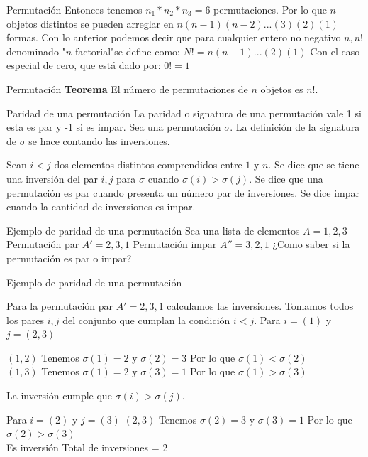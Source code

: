 \documentclass{beamer}
\begin{document}
\begin{frame}{Permutación}
  Entonces tenemos $n_1 * n_2 * n_3 = 6$ permutaciones.
  \vfill
  Por lo que $n$ objetos distintos se pueden arreglar en
  $n(n-1)(n-2)...(3)(2)(1)$ formas.
  \vfill
  Con lo anterior podemos decir que para cualquier entero no negativo $n,n!$
  denominado "$n$ factorial"se define como:
  \vfill
  $N! = n(n-1)...(2)(1)$
  \vfill
  Con el caso especial de cero, que está dado por:
  $0!=1$
\end{frame}


\begin{frame}{Permutación}
\textbf{Teorema}
\vfill
El número de permutaciones de $n$ objetos es $n!$.

\end{frame}


\begin{frame}{Paridad de una permutación}
La paridad o signatura de una permutación vale 1 si esta es par y -1 si es
impar.
\vfill
Sea una permutación $\sigma$. La definición de la signatura de $\sigma$ se hace contando las inversiones.

\vfill

Sean $i < j$ dos elementos distintos comprendidos entre $1$ y $n$. Se dice que
se tiene una inversión del par ${i, j}$ para $\sigma$ cuando $\sigma(i) > \sigma(j)$. 
\vfill
Se dice que una permutación es par cuando presenta un número par de inversiones.
\vfill
Se dice impar cuando la cantidad de inversiones es impar.

\end{frame}


\begin{frame}{Ejemplo de paridad de una permutación}
  Sea una lista de elementos $A={1,2,3}$
  \vfill
  Permutación par $A'={2,3,1}$
  \vfill
  Permutación impar $A''={3,2,1}$
  \vfill
  ¿Como saber si la permutación es par o impar?
\end{frame}

\begin{frame}{Ejemplo de paridad de una permutación}

  Para la permutación par $A'={2,3,1}$ calculamos las inversiones.
  \vfill
  Tomamos todos los pares $i,j$ del conjunto que cumplan la condición $i < j$.
  \vfill
  Para $i=(1)$ y $j=(2,3)$
  
  \vfill
  $(1,2)$ Tenemos $\sigma(1)=2$ y $\sigma(2)=3$ Por lo que $\sigma(1) < \sigma(2)$ \\
  $(1,3)$ Tenemos $\sigma(1)=2$ y $\sigma(3)=1$ Por lo que $\sigma(1) > \sigma(3)$
  \vfill
  
  La inversión cumple que $\sigma(i) > \sigma(j)$.
  
  \vfill
  
  Para $i=(2)$ y $j=(3)$
  \vfill
  $(2,3)$ Tenemos $\sigma(2)=3$ y $\sigma(3)=1$ Por lo que $\sigma(2) > \sigma(3)$\\
  Es inversión
  \vfill
  Total de inversiones = 2

\end{frame}
\end{document}
